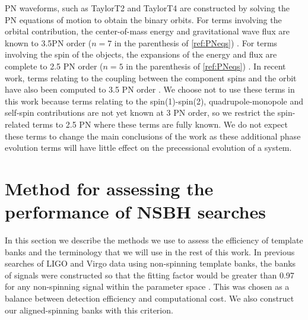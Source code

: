 \ac{PN} waveforms, such as TaylorT2 and TaylorT4 are constructed by solving the
\ac{PN} equations of motion to obtain the binary orbits. For terms involving the orbital
contribution, the center-of-mass energy and gravitational wave flux are known 
to 3.5\ac{PN} order ($n=7$ in the parenthesis of \ref{ref:PNeqs})
\cite{Wiseman:1993aj,Blanchet:1995fg,Blanchet:1995ez,Blanchet:1996pi,
Blanchet:2001ax, Blanchet:2004ek}. For terms
involving the spin of the objects, the expansions of the energy and
flux are complete to 2.5 \ac{PN} order ($n=5$ in the parenthesis of 
\ref{ref:PNeqs})
\cite{Kidder:1992fr,Kidder:1995zr,Arun:2008kb}. In recent work,
terms relating to the coupling between the component spins and the orbit have
also been computed to 3.5 \ac{PN} order \cite{Blanchet:2012sm,Bohe:2013cla}. We
choose not to use these terms in this work because terms relating to the
spin(1)-spin(2), quadrupole-monopole and self-spin contributions are not yet
known at 3 \ac{PN} order, so we restrict the spin-related terms to 2.5 \ac{PN}
where these terms are fully known. We do not expect these terms to change the 
main conclusions of the work as these additional phase evolution terms will 
have little effect on the precessional evolution of a system.

\section{Method for assessing the performance of NSBH searches}
\label{sec:bank_testing}

In this section we describe the methods we use to assess the efficiency of
template banks and the terminology that we will use in the rest of this work.
In previous searches of LIGO and Virgo data using
non-spinning template banks, the banks of signals were constructed so that the
fitting factor would be greater than 0.97 for any non-spinning signal within
the parameter space \cite{Babak:2012zx}. This was chosen as a balance between
detection efficiency and computational cost. We also construct our 
aligned-spinning banks with this criterion.

